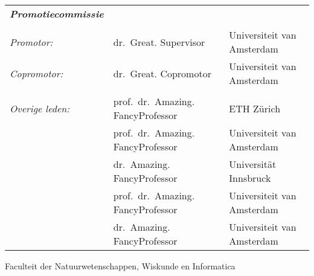 \begin{titlepage}
\begin{center}
        \endgroup

        \vfill
        \end{center}
        
        
        \newpage


        \small
        \hfill

        \begin{table}[t]
        \small\hspace*{-1.35cm}
        \begin{tabular}{lll} 
        \textbf{\textit{Promotiecommissie}}&&\\
        &&\\
 	\textit{Promotor:}& dr.\ Great. Supervisor & Universiteit van Amsterdam \\ 
	\textit{Copromotor:}& dr.\ Great. Copromotor & Universiteit van Amsterdam\\ 
	&&\\
 	\textit{Overige leden:}& prof.\ dr.\ Amazing. FancyProfessor & ETH Z\"urich \\ 
 	& prof.\ dr.\ Amazing. FancyProfessor & Universiteit van Amsterdam\\
	& dr.\ Amazing. FancyProfessor  & Universit\"at Innsbruck\\
	& prof.\ dr.\ Amazing. FancyProfessor  & Universiteit van Amsterdam\\
	& dr.\ Amazing. FancyProfessor  & Universiteit van Amsterdam\\
	\end{tabular}
	\end{table}
	
	\vspace{3em}
    \noindent
    \begin{center}
	Faculteit der Natuurwetenschappen, Wiskunde en Informatica\end{center}
 

\end{titlepage}
